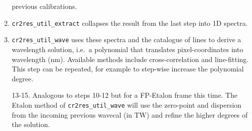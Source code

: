 \begin{enumerate}
          previous
          calibrations.
    \item \texttt{cr2res\_util\_extract} collapses the result from the last
          step into
          1D spectra.
    \item \texttt{cr2res\_util\_wave} uses these spectra and the catalogue of
          lines to
          derive a wavelength solution, i.e.~a polynomial that translates
          pixel-coordinates
          into wavelength (nm). Available methods include cross-correlation and
          line-fitting. This step can be repeated, for example to step-wise
          increase the
          polynomial degree.
    \item[13-15.] Analogous to steps 10-12 but for a FP-Etalon frame this time.
          The Etalon method of \texttt{cr2res\_util\_wave} will use the
          zero-point
          and dispersion from the incoming previous wavecal (in TW) and refine
          the
          higher degrees of the solution.
\end{enumerate}